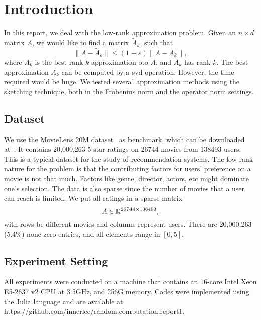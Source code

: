 \section{Introduction}
\label{sec:intro}

In this report, we deal with the low-rank approximation problem.
Given an $n\times d$ matrix $A$,
we would like to find a matrix $\tilde{A}_k$,
such that
\begin{equation}
    \| A - \tilde{A}_k \| \le (1+\varepsilon) \| A - A_k \|,
\end{equation}
where $A_k$ is the best rank-$k$ approximation oto $A$,
and $\tilde{A}_k$ has rank $k$.
The best approximation $A_k$ can be computed by a svd operation.
However, the time required would be huge.
We tested several approximation methods using the sketching technique,
both in the Frobenius norm and the operator norm settings.

\subsection{Dataset}

We use the MovieLens 20M dataset~\cite{lens} as benchmark,
which can be downloaded at~\cite{movielens}.
It contains 20,000,263 5-star ratings on 26744 movies from 138493 users.
This is a typical dataset for the study of recommendation systems.
The low rank nature for the problem is that the contributing factors
for users' preference on a movie is not that much.
Factors like genre, director, actors, etc might dominate one's selection.
The data is also sparse
since the number of movies that a user can reach is limited.
We put all ratings in a sparse matrix
\begin{equation}
    A \in {\mathbb{R}}^{26744\times 138493},
\end{equation}
with rows be different movies and columns represent users.
There are 20,000,263 (5.4\%) none-zero entries,
and all elements range in $[0, 5]$.

\subsection{Experiment Setting}

All experiments were conducted on a machine that contains an 16-core
Intel Xeon E5-2637 v2 CPU at 3.5GHz, and 256G memory.
Codes were implemented using the Julia language and are available at
https://github.com/innerlee/random.computation.report1.
